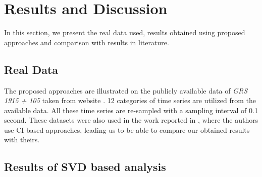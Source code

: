 \documentclass[journal]{IEEEtran}
\begin{document}
	
	
	\section{Results and Discussion} \label{rnd}
	In this section, we present the real data used, results obtained using proposed approaches and comparison with results in literature.
	
	\subsection{Real Data}
	The proposed approaches are illustrated on the publicly available data of \textit{GRS 1915 + 105} taken from website \cite{xte}. 12 categories of time series are utilized from the available data. All these time series are re-sampled with a sampling interval of 0.1 second. These datasets  were  also used in the work reported in \cite{Adegoke2018}, where the authors use CI based approaches, leading us to be able to compare our obtained results with theirs.

	\subsection{Results of SVD based analysis}
	
	
\end{document}
